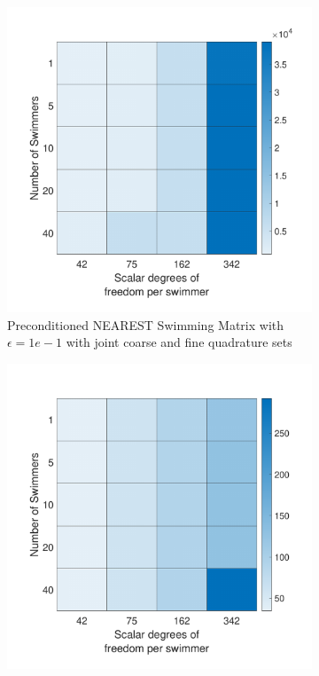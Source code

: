 \begin{figure}
\ContinuedFloat
    \begin{subfigure}{0.3\textwidth}
        \includegraphics[width=\linewidth]{Images/Condition/Mobility Matrix using Contained NEAREST Preconditioned-1.pdf}
        \caption{Preconditioned NEAREST Swimming Matrix with $\epsilon=1e-1$ with joint coarse and fine quadrature sets}    
    \end{subfigure}
    \begin{subfigure}{0.3\textwidth}
        \includegraphics[width=\linewidth]{Images/Condition/Mobility Matrix using Contained NEAREST Preconditioned-2.pdf}

\end{subfigure}
\end{figure}
